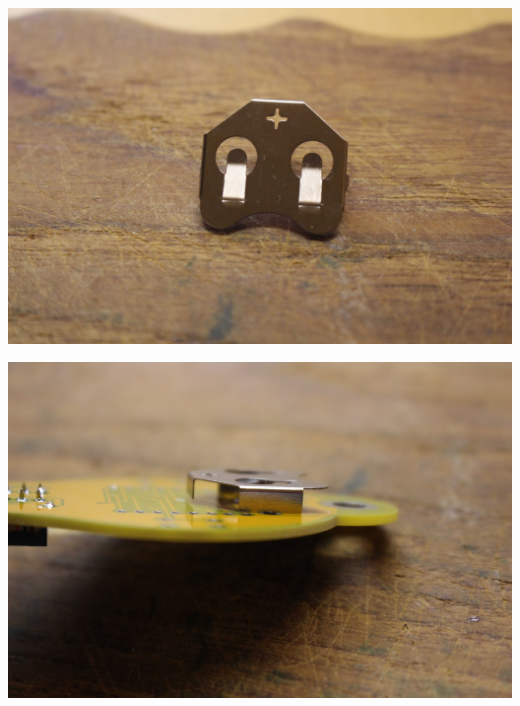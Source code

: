 \documentclass{article}
\begin{document}
\begin{minipage}[b]{0.5\textwidth}
	\includegraphics[width=\textwidth]{Bilder/IMG_5565.JPG}
\end{minipage}
\begin{minipage}[b]{0.5\textwidth}
	\includegraphics[width=\textwidth]{Bilder/IMG_5566.JPG}
\end{minipage}

\vspace{0.5cm}
\end{document}
